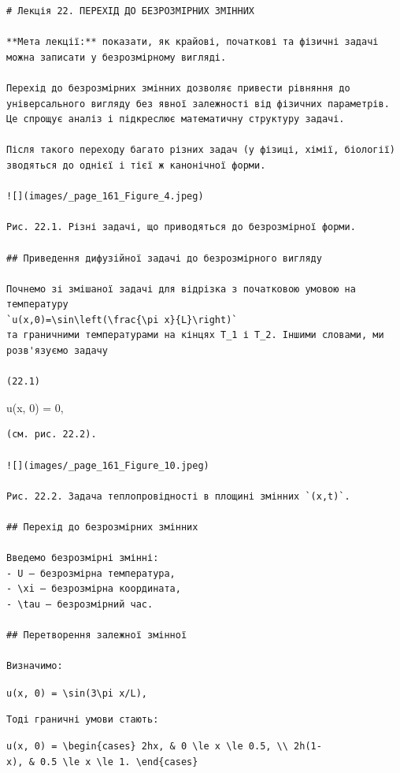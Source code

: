\documentclass[
  ukrainian,
]{article}
\begin{document}
\begin{verbatim}
# Лекція 22. ПЕРЕХІД ДО БЕЗРОЗМІРНИХ ЗМІННИХ

**Мета лекції:** показати, як крайові, початкові та фізичні задачі можна записати у безрозмірному вигляді.

Перехід до безрозмірних змінних дозволяє привести рівняння до універсального вигляду без явної залежності від фізичних параметрів. Це спрощує аналіз і підкреслює математичну структуру задачі.

Після такого переходу багато різних задач (у фізиці, хімії, біології) зводяться до однієї і тієї ж канонічної форми.

![](images/_page_161_Figure_4.jpeg)

Рис. 22.1. Різні задачі, що приводяться до безрозмірної форми.

## Приведення дифузійної задачі до безрозмірного вигляду

Почнемо зі змішаної задачі для відрізка з початковою умовою на температуру  
`u(x,0)=\sin\left(\frac{\pi x}{L}\right)`  
та граничними температурами на кінцях T_1 і T_2. Іншими словами, ми розв'язуємо задачу

(22.1)
\end{verbatim}

u(x, 0) = 0,

\begin{verbatim}
(см. рис. 22.2).

![](images/_page_161_Figure_10.jpeg)

Рис. 22.2. Задача теплопровідності в площині змінних `(x,t)`.

## Перехід до безрозмірних змінних

Введемо безрозмірні змінні:
- U — безрозмірна температура,
- \xi — безрозмірна координата,
- \tau — безрозмірний час.

## Перетворення залежної змінної

Визначимо:
\end{verbatim}

\texttt{u(x,\ 0)\ =\ \textbackslash{}sin(3\textbackslash{}pi\ x/L),}

\begin{verbatim}
Тоді граничні умови стають:
\end{verbatim}

\texttt{u(x,\ 0)\ =\ \textbackslash{}begin\{cases\}\ 2hx,\ \&\ 0\ \textbackslash{}le\ x\ \textbackslash{}le\ 0.5,\ \textbackslash{}\textbackslash{}\ 2h(1-x),\ \&\ 0.5\ \textbackslash{}le\ x\ \textbackslash{}le\ 1.\ \textbackslash{}end\{cases\}}
\end{document}
